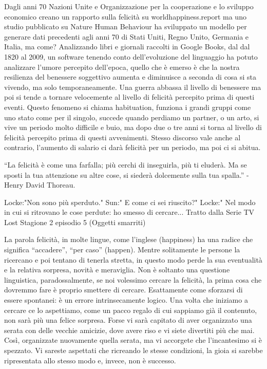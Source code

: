 \documentclass[12pt]{book} %
\begin{document}
Dagli anni 70 Nazioni Unite e Organizzazione per la cooperazione e lo sviluppo economico creano un rapporto sulla
felicità su worldhappiness.report ma uno studio pubblicato su Nature Human
Behaviour ha sviluppato un modello per generare dati
precedenti agli anni 70 di Stati Uniti, Regno Unito, Germania e Italia, ma come? Analizzando libri e giornali raccolti
in Google Books, dal dal 1820 al 2009, un software tenendo conto dell'evoluzione del linguaggio ha
potuto analizzare l'umore percepito dell'epoca, quello che è emerso è che la
nostra resilienza del benessere soggettivo aumenta e diminuisce a seconda di cosa si sta vivendo, ma solo
temporaneamente. Una guerra abbassa il livello di benessere ma poi si tende a tornare velocemente al livello di
felicità percepito prima di questi eventi. Questo fenomeno si chiama habituation, funziona i grandi gruppi come uno
stato come per il singolo, succede quando perdiamo un partner, o un arto, si vive un periodo molto difficile e buio, ma
dopo due o tre anni si torna al livello di felicità percepito prima di questi avvenimenti. Stesso discorso vale anche
al contrario, l'aumento di salario ci darà felicità per un periodo, ma poi ci si
abitua.


\bigskip

“La felicità è come una farfalla; più cerchi di inseguirla, più ti eluderà. Ma se sposti la tua attenzione su altre
cose, si siederà dolcemente sulla tua spalla.” - Henry David Thoreau.

Locke:"Non sono più sperduto." 
Sun:" E come ci sei riuscito?" 
Locke:" Nel modo in cui si ritrovano le cose perdute: ho smesso di cercare...
Tratto dalla Serie TV Lost Stagione 2 episodio 5 (Oggetti smarriti)

La parola felicità, in molte lingue, come l'inglese (happiness) ha una radice che significa
“accadere”, “per caso” (happen). Mentre solitamente le persone la ricercano e poi tentano di tenerla stretta, in questo
modo perde la sua eventualità e la relativa sorpresa, novità e meraviglia. Non è soltanto una questione linguistica,
paradossalmente, se noi volessimo cercare la felicità, la prima cosa che dovremmo fare è proprio smettere di cercare.
Esattamente come sforzarsi di essere spontanei: è un errore intrinsecamente logico. Una volta che iniziamo a cercare ce
lo aspettiamo, come un pacco regalo di cui sappiamo già il contenuto, non sarà più una felice sorpresa. Forse vi sarà
capitato di aver organizzato una serata con delle vecchie amicizie, dove avere riso e vi siete divertiti più che mai.
Così, organizzate nuovamente quella serata, ma vi accorgete che l'incantesimo si è spezzato. Vi
sareste aspettati che ricreando le stesse condizioni, la gioia si sarebbe ripresentata allo stesso modo e, invece, non
è successo. 
\end{document}
